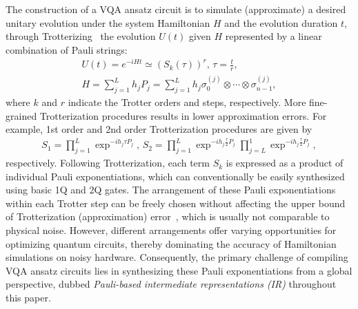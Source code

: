 \documentclass[conference,9pt]{IEEEtran}
\begin{document}
    The construction of a VQA ansatz circuit is to simulate (approximate) a desired unitary evolution under the system Hamiltonian $ H $ and the evolution duration $ t $, through Trotterizing~\cite{cerezo2021variational} the evolution $ U(t) $ given $ H $ represented by a linear combination of Pauli strings:
    \begin{align}
        U(t) = e^{-iHt} \simeq  \left( S_{k}\left(\tau\right) \right)^r,\, \tau = \frac{t}{r},\\
        H = \sum_{j=1}^L h_j P_j = \sum_{j=1}^L h_j \sigma_0^{(j)} \otimes \cdots \otimes \sigma_{n-1}^{(j)},
    \end{align}
    where $ k $ and $ r $ indicate the Trotter orders and steps, respectively. More fine-grained Trotterization procedures results in lower approximation errors. For example, 1st order and 2nd order Trotterization procedures are given by
    \begin{align*}
        S_1 = \prod_{j=1}^{L} \exp^{ -i h_j \tau P_j},\, S_2 = \prod_{j=1}^{L} \exp^{ -i h_j \frac{\tau}{2} P_j}\prod_{j=L}^1 \exp^{ -i h_j \frac{\tau}{2} P_j},
    \end{align*}
    respectively.
Following Trotterization, each term $S_k$ is expressed as a product of individual Pauli exponentiations, which can conventionally be easily synthesized using basic 1Q and 2Q gates. The arrangement of these Pauli exponentiations within each Trotter step can be freely chosen without affecting the upper bound of Trotterization (approximation) error~\cite{cerezo2021variational}, which is usually not comparable to physical noise. However, different arrangements offer varying opportunities for optimizing quantum circuits, thereby dominating the accuracy of Hamiltonian simulations on noisy hardware. Consequently, the primary challenge of compiling VQA ansatz circuits lies in synthesizing these Pauli exponentiations from a global perspective, dubbed \emph{Pauli-based intermediate representations (IR)} throughout this paper.
\end{document}
